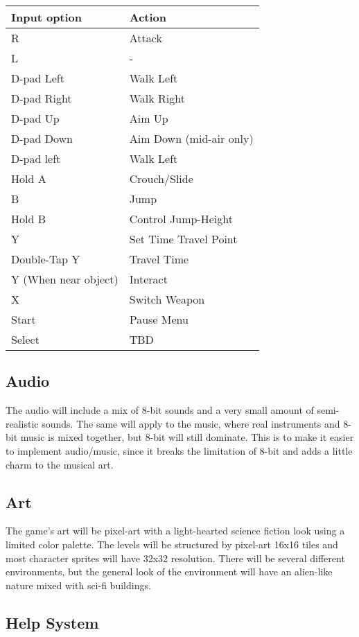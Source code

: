 \documentclass[12pt]{article}
\begin{document}
\begin{center}
\begin{tabular}{ | l | l | }
 \hline
 \textbf{Input option} & \textbf{Action} \\
 \hline
 R & Attack \\  
 \hline 
 L & - \\
 \hline
 D-pad Left & Walk Left \\
 \hline
 D-pad Right & Walk Right \\
 \hline
 D-pad Up & Aim Up \\
 \hline
 D-pad Down & Aim Down (mid-air only) \\
 \hline
 D-pad left & Walk Left \\
 \hline
 Hold A & Crouch/Slide \\
 \hline
 B & Jump \\
 \hline
 Hold B & Control Jump-Height\\
 \hline
 Y & Set Time Travel Point \\
 \hline
 Double-Tap Y & Travel Time \\
 \hline
  Y (When near object) & Interact \\
 \hline
 X & Switch Weapon \\
 \hline
 Start & Pause Menu \\
 \hline
 Select & TBD \\
 \hline
\end{tabular}
\end{center}

\subsection{Audio}

The audio will include a mix of 8-bit sounds and a very small amount of semi-realistic sounds. The same will apply to the music, where real instruments and 8-bit music is mixed together, but 8-bit will still dominate. This is to make it easier to implement audio/music, since it breaks the limitation of 8-bit and adds a little charm to the musical art. 

\subsection{Art}

The game's art will be pixel-art with a light-hearted science fiction look using a limited color palette. The levels will be structured by pixel-art 16x16 tiles and most character sprites will have 32x32 resolution. There will be several different environments, but the general look of the environment will have an alien-like nature mixed with sci-fi buildings. 

\subsection{Help System}
\end{document}

